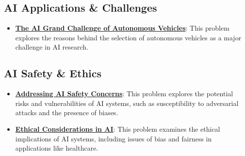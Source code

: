 \documentclass{article}%
\begin{document}
%
\subsection{AI Applications \& Challenges}%
\label{subsec:AIApplicationsChallenges}%
\begin{itemize}[leftmargin=*]%
\item \href{\url{https://purdue.brightspace.com/d2l/common/assets/pdfjs-d2l-dist/1.0.14-legacy/web/viewer.html?file=\%252Fcontent\%252Fenforced\%252F1095467-wl.202510.CS.24300.001\%252F02L2-Intro.pdf\%253Fou\%253D1095467\&lang=en-us\&container=d2l-fileviewer-rendered-pdf\&fullscreen=d2l-fileviewer-rendered-pdf-dialog\&height=667}#page=43}{\textbf{The AI Grand Challenge of Autonomous Vehicles}}: This problem explores the reasons behind the selection of autonomous vehicles as a major challenge in AI research.%
\end{itemize}

%
\subsection{AI Safety \& Ethics}%
\label{subsec:AISafetyEthics}%
\begin{itemize}[leftmargin=*]%
\item \href{\url{https://purdue.brightspace.com/d2l/common/assets/pdfjs-d2l-dist/1.0.14-legacy/web/viewer.html?file=\%252Fcontent\%252Fenforced\%252F1095467-wl.202510.CS.24300.001\%252F02L2-Intro.pdf\%253Fou\%253D1095467\&lang=en-us\&container=d2l-fileviewer-rendered-pdf\&fullscreen=d2l-fileviewer-rendered-pdf-dialog\&height=667}#page=19}{\textbf{Addressing AI Safety Concerns}}: This problem explores the potential risks and vulnerabilities of AI systems, such as susceptibility to adversarial attacks and the presence of biases.%
\item \href{\url{https://purdue.brightspace.com/d2l/common/assets/pdfjs-d2l-dist/1.0.14-legacy/web/viewer.html?file=\%252Fcontent\%252Fenforced\%252F1095467-wl.202510.CS.24300.001\%252F02L2-Intro.pdf\%253Fou\%253D1095467\&lang=en-us\&container=d2l-fileviewer-rendered-pdf\&fullscreen=d2l-fileviewer-rendered-pdf-dialog\&height=667}#page=20}{\textbf{Ethical Considerations in AI}}: This problem examines the ethical implications of AI systems, including issues of bias and fairness in applications like healthcare.%
\end{itemize}

%
\end{document}
